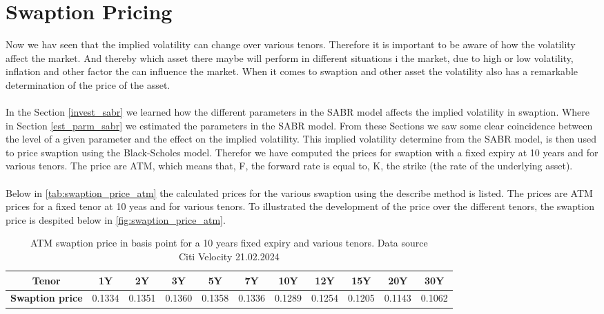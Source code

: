 \section{Swaption Pricing} \label{swaption_price_sec}
Now we hav seen that the implied volatility can change over various tenors. 
Therefore it is important to be aware of how the volatility affect the market.
And thereby which asset there maybe will perform in different situations i the market,
due to high or low volatility, inflation and other factor the can influence the market.
When it comes to swaption and other asset the volatility also has
a remarkable determination of the price of the asset. 
\\\\
In the Section \ref{invest_sabr} we learned how the different parameters in the 
SABR model affects the implied volatility in swaption. 
Where in Section \ref{est_parm_sabr} we estimated the parameters in the SABR model. 
From these Sections we saw some clear coincidence between the level of a given parameter
and the effect on the implied volatility. 
This implied volatility determine from the SABR model, is then used to price swaption using the 
Black-Scholes model. 
Therefor we have computed the prices for swaption with a fixed expiry at 10 years and for various tenors. 
The price are ATM, which means that, F, the forward rate is equal to, K, 
the strike (the rate of the underlying asset). 
\\\\
Below in \autoref{tab:swaption_price_atm} the calculated prices for the various swaption 
using the describe method is listed. 
The prices are ATM prices for a fixed tenor at 10 yeas and for various tenors. 
To illustrated the development of the price over the different tenors, 
the swaption price is despited below in  \autoref{fig:swaption_price_atm}.
\begin{table}[H]
  \centering
  \begin{tabular}{ccccccccccc}
    \toprule
    \textbf{ Tenor} & 1Y & 2Y & 3Y & 5Y & 7Y & 10Y & 12Y & 15Y & 20Y & 30Y \\
    \midrule
    \textbf{ Swaption price }&0.1334 & 0.1351 & 0.1360 &0.1358  &0.1336  &0.1289
    &0.1254& 0.1205 & 0.1143 & 0.1062 \\
    \bottomrule
  \end{tabular}
  \caption{ATM swaption price in basis point for a 10 years fixed expiry and various tenors.
  Data source  \\ Citi Velocity 21.02.2024}
  \label{tab:swaption_price_atm}
\end{table}
